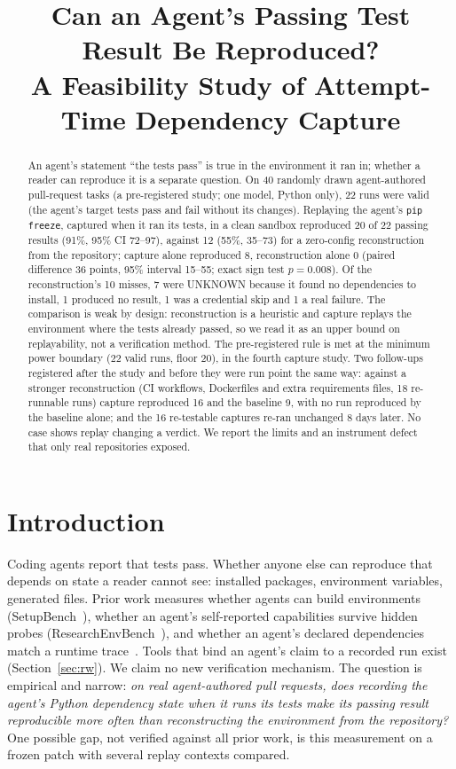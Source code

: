 \documentclass[10pt,conference]{IEEEtran}
\newcommand{\pip}{\texttt{pip freeze}}
\begin{document}
\title{Can an Agent's Passing Test Result Be Reproduced?\\A Feasibility Study of Attempt-Time Dependency Capture}
\author{}
\maketitle

\begin{abstract}
An agent's statement ``the tests pass'' is true in the environment it ran in; whether a reader can reproduce it is a separate question. On 40 randomly drawn agent-authored pull-request tasks (a pre-registered study; one model, Python only), 22 runs were valid (the agent's target tests pass and fail without its changes). Replaying the agent's \pip{}, captured when it ran its tests, in a clean sandbox reproduced 20 of 22 passing results (91\%, 95\% CI 72--97), against 12 (55\%, 35--73) for a zero-config reconstruction from the repository; capture alone reproduced 8, reconstruction alone 0 (paired difference 36 points, 95\% interval 15--55; exact sign test $p=0.008$). Of the reconstruction's 10 misses, 7 were UNKNOWN because it found no dependencies to install, 1 produced no result, 1 was a credential skip and 1 a real failure. The comparison is weak by design: reconstruction is a heuristic and capture replays the environment where the tests already passed, so we read it as an upper bound on replayability, not a verification method. The pre-registered rule is met at the minimum power boundary (22 valid runs, floor 20), in the fourth capture study. Two follow-ups registered after the study and before they were run point the same way: against a stronger reconstruction (CI workflows, Dockerfiles and extra requirements files, 18 re-runnable runs) capture reproduced 16 and the baseline 9, with no run reproduced by the baseline alone; and the 16 re-testable captures re-ran unchanged 8 days later. No case shows replay changing a verdict. We report the limits and an instrument defect that only real repositories exposed.
\end{abstract}

\section{Introduction}
Coding agents report that tests pass. Whether anyone else can reproduce that depends on state a reader cannot see: installed packages, environment variables, generated files. Prior work measures whether agents can build environments (SetupBench~\cite{setupbench}), whether an agent's self-reported capabilities survive hidden probes (ResearchEnvBench~\cite{renv}), and whether an agent's declared dependencies match a runtime trace~\cite{vangala}. Tools that bind an agent's claim to a recorded run exist (Section~\ref{sec:rw}). We claim no new verification mechanism. The question is empirical and narrow: \emph{on real agent-authored pull requests, does recording the agent's Python dependency state when it runs its tests make its passing result reproducible more often than reconstructing the environment from the repository?} One possible gap, not verified against all prior work, is this measurement on a frozen patch with several replay contexts compared.
\end{document}
